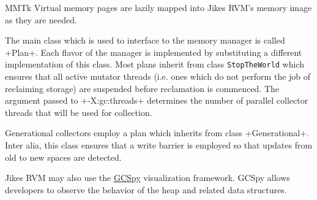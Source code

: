 \begin{chapter}{MMTk}
Virtual memory pages are lazily mapped into Jikes RVM's memory image as they are needed.

The main class which is used to interface to the memory manager is called \spverb+Plan+. Each flavor of the manager is implemented by substituting a different implementation of this class. Most plans inherit from class \texttt{Stop\-The\-World} which ensures that all active mutator threads (i.e. ones which do not perform the job of reclaiming storage) are suspended before reclamation is commenced. The argument passed to \spverb+-X:gc:threads+ determines the number of parallel collector threads that will be used for collection.

Generational collectors employ a plan which inherits from class \spverb+Generational+. Inter alia, this class ensures that a write barrier is employed so that updates from old to new spaces are detected.

Jikes RVM may also use the \hyperref[sec:usinggcspy]{GCSpy} visualization framework. GCSpy allows developers to observe the behavior of the heap and related data structures.










\end{chapter}
